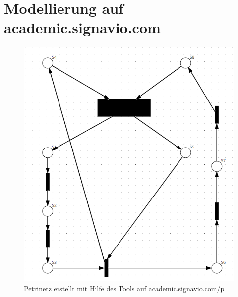 \documentclass{article}
\begin{document}
\newpage
	\section{Modellierung auf academic.signavio.com}
		\begin{figure}[h]
			\includegraphics[scale=0.55, center]{petrinet_01_signavio.png}
			\caption{Petrinetz erstellt mit Hilfe des Tools auf academic.signavio.com/p}
			\label{fig_3: petrinet_01}
		\end{figure}
\newpage
\end{document}
